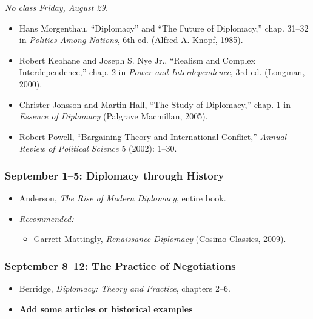 \emph{No class Friday, August 29.}

\begin{itemize}
\item
  Hans Morgenthau, ``Diplomacy'' and ``The Future of Diplomacy,'' chap.
  31--32 in \emph{Politics Among Nations}, 6th ed. (Alfred A. Knopf,
  1985).
\item
  Robert Keohane and Joseph S. Nye Jr., ``Realism and Complex
  Interdependence,'' chap. 2 in \emph{Power and Interdependence}, 3rd
  ed. (Longman, 2000).
\item
  Christer Jonsson and Martin Hall, ``The Study of Diplomacy,'' chap. 1
  in \emph{Essence of Diplomacy} (Palgrave Macmillan, 2005).
\item
  Robert Powell,
  \href{http://www.annualreviews.org/doi/abs/10.1146/annurev.polisci.5.092601.141138}{``Bargaining
  Theory and International Conflict,''} \emph{Annual Review of Political
  Science} 5 (2002): 1--30.
\end{itemize}

\subsubsection{September 1--5: Diplomacy through
History}\label{september-15-diplomacy-through-history}

\begin{itemize}
\item
  Anderson, \emph{The Rise of Modern Diplomacy}, entire book.
\item
  \emph{Recommended:}

  \begin{itemize}
  \itemsep1pt\parskip0pt
  \item
    Garrett Mattingly, \emph{Renaissance Diplomacy} (Cosimo Classics,
    2009).
  \end{itemize}
\end{itemize}

\subsubsection{September 8--12: The Practice of
Negotiations}\label{september-812-the-practice-of-negotiations}

\begin{itemize}
\item
  Berridge, \emph{Diplomacy: Theory and Practice}, chapters 2--6.
\item
  \textbf{Add some articles or historical examples}
\end{itemize}

